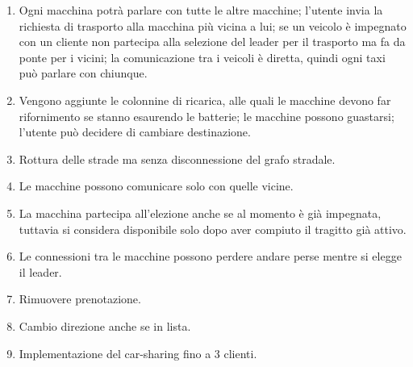 \begin{enumerate}
	\item Ogni macchina potrà parlare con tutte le altre macchine; l'utente invia la richiesta di trasporto alla macchina più vicina a lui; se un veicolo è impegnato con un cliente non partecipa alla selezione del leader per il trasporto ma fa da ponte per i vicini; la comunicazione tra i veicoli è diretta, quindi ogni taxi può parlare con chiunque.
	\item Vengono aggiunte le colonnine di ricarica, alle quali le macchine devono far rifornimento se stanno esaurendo le batterie; le macchine possono guastarsi; l'utente può decidere di cambiare destinazione.
	\item Rottura delle strade ma senza disconnessione del grafo stradale.
	\item Le macchine possono comunicare solo con quelle vicine.
	\item La macchina partecipa all'elezione anche se al momento è già impegnata, tuttavia si considera disponibile solo dopo aver compiuto il tragitto già attivo.
	\item Le connessioni tra le macchine possono perdere andare perse mentre si elegge il leader.
	\item Rimuovere prenotazione.
	\item Cambio direzione anche se in lista.
	\item Implementazione del car-sharing fino a 3 clienti.
\end{enumerate}